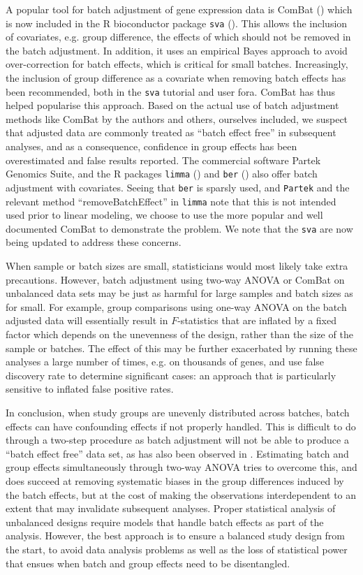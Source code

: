 \documentclass{bio}
\begin{document}
A popular tool for batch adjustment of gene expression data is ComBat (\citealp{Johnson2007}) which is now included in the R bioconductor package \texttt{sva} (\citealp{Leek2012}). This allows the inclusion of covariates, e.g. group difference, the effects of which should not be removed in the batch adjustment. In addition, it uses an empirical Bayes approach to avoid over-correction for batch effects, which is critical for small batches. Increasingly, the inclusion of group difference as a covariate when removing batch effects has been recommended, both in the \texttt{sva} tutorial and user fora. ComBat has thus helped popularise this approach. Based on the actual use of batch adjustment methods like ComBat by the authors and others, ourselves included, we suspect that adjusted data are commonly treated as ``batch effect free'' in subsequent analyses, and as a consequence, confidence in group effects has been overestimated and false results reported. The commercial software Partek Genomics Suite, and the R packages \texttt{limma} (\citealp{Smyth2003}) and \texttt{ber} (\citealp{Giordan2013}) also offer batch adjustment with covariates. Seeing that \texttt{ber} is sparsly used, and \texttt{Partek} and the relevant method ``removeBatchEffect'' in \texttt{limma} note that this is not intended used prior to linear modeling, we choose to use the more popular and well documented ComBat to demonstrate the problem. We note that the \texttt{sva} are now being updated to address these concerns.

When sample or batch sizes are small, statisticians would most likely take extra precautions. However, batch adjustment using two-way ANOVA or ComBat on unbalanced data sets may be just as harmful for large samples and batch sizes as for small. For example, group comparisons using one-way ANOVA on the batch adjusted data will essentially result in $F$-statistics that are inflated by a fixed factor which depends on the unevenness of the design, rather than the size of the sample or batches. The effect of this may be further exacerbated by running these analyses a large number of times, e.g. on thousands of genes, and use false discovery rate to determine significant cases: an approach that is particularly sensitive to inflated false positive rates.

In conclusion, when study groups are unevenly distributed across batches, batch effects can have confounding effects if not properly handled. This is difficult to do through a two-step procedure as batch adjustment will not be able to produce a ``batch effect free'' data set, as has also been observed in \citet{Buhule2014}. Estimating batch and group effects simultaneously through two-way ANOVA tries to overcome this, and does succeed at removing systematic biases in the group differences induced by the batch effects, but at the cost of making the observations interdependent to an extent that may invalidate subsequent analyses. Proper statistical analysis of unbalanced designs require models that handle batch effects as part of the analysis. However, the best approach is to ensure a balanced study design from the start, to avoid data analysis problems as well as the loss of statistical power that ensues when batch and group effects need to be disentangled.
\end{document}
